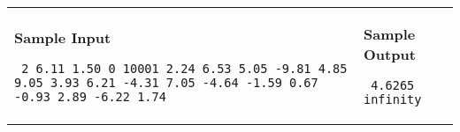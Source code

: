 \documentclass[11pt]{article}
\begin{document}
\vspace{0.25in}\hspace{-0.3in}\begin{tabular}{ll}

\parbox{3in}{{\large\bf Sample Input}

\vspace{0.15in}

{\tt 
2 6.11 1.50 0 10001 2.24 6.53 5.05 -9.81 4.85 9.05 3.93 6.21 -4.31 7.05 -4.64 -1.59 0.67 -0.93 2.89 -6.22 1.74
}
}

&

\parbox{3in}{{\large\bf Sample Output}

\vspace{0.15in}

{\tt
4.6265\linebreak
infinity
}
}

\vspace{0.2in}


\\
\end{tabular}
\end{document}
